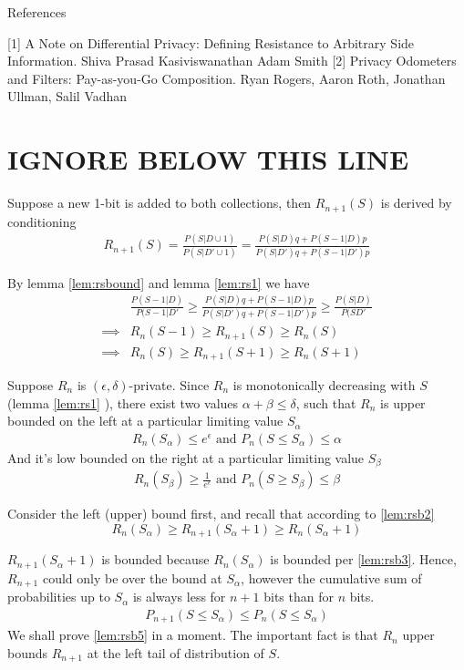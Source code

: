 \documentclass[11pt]{article}
\begin{document}
\newpage

References

[1] A Note on Differential Privacy: Defining Resistance to Arbitrary Side Information.  Shiva Prasad Kasiviswanathan Adam Smith
[2] Privacy Odometers and Filters: Pay-as-you-Go Composition. Ryan Rogers, Aaron Roth, Jonathan Ullman, Salil Vadhan


 \newpage
 \section{IGNORE BELOW THIS LINE}
 
 Suppose a new 1-bit is added to both collections, then $R_{n+1}(S)$ is derived by conditioning
 \begin{align*}
R_{n+1}(S) = \frac{ P(S|D \cup 1) }{ P(S|D' \cup 1) } = \frac { P(S|D)q + P(S-1|D)p } { P(S|D')q + P(S-1|D')p}
\end{align*}
 
By lemma \eqref{lem:rsbound} and lemma  \eqref{lem:rs1} we have
\begin{align}
 & \frac{P(S-1|D)}{P(S-1|D'} \ge  \frac { P(S|D)q + P(S-1|D)p } { P(S|D')q + P(S-1|D')p} \ge \frac{P(S|D)}{P(SD'} \\
\implies & R_n(S-1) \ge R_{n+1}(S) \ge R_n(S) \\
\implies & R_n(S) \ge R_{n+1}(S+1) \ge R_n(S+1) \label{lem:rsb2}
\end{align}
 
Suppose $R_n$ is $(\epsilon, \delta)$-private. Since $R_n$ is monotonically decreasing with $S$ (lemma  \eqref{lem:rs1} ), there exist two values $\alpha + \beta \le \delta$, such that $R_n$ is upper bounded on the left at a particular limiting value $S_\alpha$ 
 \begin{align}  \label{lem:rsb3}
 R_n(S_\alpha) \le e^\epsilon \text{ and } P_n(S \le S_\alpha) \le \alpha 
\end{align}
And it's low bounded on the right at a particular limiting value $S_\beta$
 \begin{align}  \label{lem:rsb4}
 R_n(S_\beta) \ge \frac{1}{e^\epsilon} \text{ and } P_n(S \ge S_\beta) \le \beta
\end{align}
 
Consider the left (upper) bound first, and recall that according to \eqref{lem:rsb2}
\[
 R_n(S_\alpha) \ge R_{n+1}(S_\alpha+1) \ge R_n(S_\alpha+1)
 \]
 
$R_{n+1}(S_\alpha+1)$ is bounded because  $R_n(S_\alpha)$ is bounded per \eqref{lem:rsb3}.  Hence, $R_{n+1}$ could only be over the bound at $S_\alpha$, however the cumulative sum of probabilities up to $S_\alpha$ is always less for $n+1$ bits than for $n$ bits.
 \begin{align}  \label{lem:rsb5}
P_{n+1}(S \le S_\alpha) \le P_{n}(S \le S_\alpha)
\end{align}
We shall prove \eqref{lem:rsb5} in a moment. The important fact is that $R_n$ upper bounds $R_{n+1}$ at the left tail of distribution of $S$. 
\end{document}
